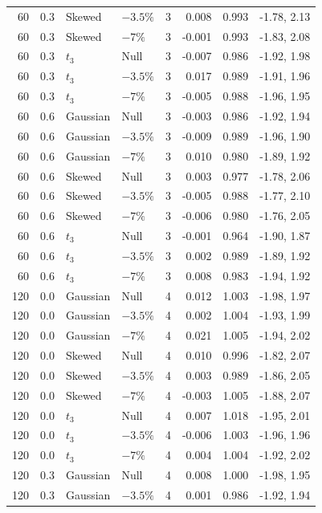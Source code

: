 \begin{longtable}{rrllrrrr}
60 & 0.3 & Skewed & $-3.5\%$ & 3 & 0.008 & 0.993 & -1.78, 2.13 \\
60 & 0.3 & Skewed & $-7\%$ & 3 & -0.001 & 0.993 & -1.83, 2.08 \\
60 & 0.3 & $t_3$ & Null & 3 & -0.007 & 0.986 & -1.92, 1.98 \\
60 & 0.3 & $t_3$ & $-3.5\%$ & 3 & 0.017 & 0.989 & -1.91, 1.96 \\
60 & 0.3 & $t_3$ & $-7\%$ & 3 & -0.005 & 0.988 & -1.96, 1.95 \\
60 & 0.6 & Gaussian & Null & 3 & -0.003 & 0.986 & -1.92, 1.94 \\
60 & 0.6 & Gaussian & $-3.5\%$ & 3 & -0.009 & 0.989 & -1.96, 1.90 \\
60 & 0.6 & Gaussian & $-7\%$ & 3 & 0.010 & 0.980 & -1.89, 1.92 \\
60 & 0.6 & Skewed & Null & 3 & 0.003 & 0.977 & -1.78, 2.06 \\
60 & 0.6 & Skewed & $-3.5\%$ & 3 & -0.005 & 0.988 & -1.77, 2.10 \\
60 & 0.6 & Skewed & $-7\%$ & 3 & -0.006 & 0.980 & -1.76, 2.05 \\
60 & 0.6 & $t_3$ & Null & 3 & -0.001 & 0.964 & -1.90, 1.87 \\
60 & 0.6 & $t_3$ & $-3.5\%$ & 3 & 0.002 & 0.989 & -1.89, 1.92 \\
60 & 0.6 & $t_3$ & $-7\%$ & 3 & 0.008 & 0.983 & -1.94, 1.92 \\
120 & 0.0 & Gaussian & Null & 4 & 0.012 & 1.003 & -1.98, 1.97 \\
120 & 0.0 & Gaussian & $-3.5\%$ & 4 & 0.002 & 1.004 & -1.93, 1.99 \\
120 & 0.0 & Gaussian & $-7\%$ & 4 & 0.021 & 1.005 & -1.94, 2.02 \\
120 & 0.0 & Skewed & Null & 4 & 0.010 & 0.996 & -1.82, 2.07 \\
120 & 0.0 & Skewed & $-3.5\%$ & 4 & 0.003 & 0.989 & -1.86, 2.05 \\
120 & 0.0 & Skewed & $-7\%$ & 4 & -0.003 & 1.005 & -1.88, 2.07 \\
120 & 0.0 & $t_3$ & Null & 4 & 0.007 & 1.018 & -1.95, 2.01 \\
120 & 0.0 & $t_3$ & $-3.5\%$ & 4 & -0.006 & 1.003 & -1.96, 1.96 \\
120 & 0.0 & $t_3$ & $-7\%$ & 4 & 0.004 & 1.004 & -1.92, 2.02 \\
120 & 0.3 & Gaussian & Null & 4 & 0.008 & 1.000 & -1.98, 1.95 \\
120 & 0.3 & Gaussian & $-3.5\%$ & 4 & 0.001 & 0.986 & -1.92, 1.94 \\

\end{longtable}
